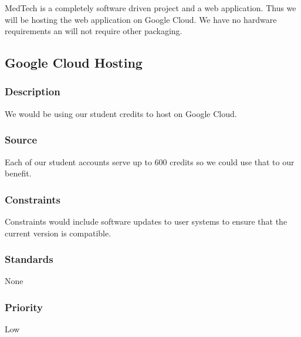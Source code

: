 MedTech is a completely software driven project and a web application. Thus we will be hosting the web application on Google Cloud. We have no hardware requirements an will not require other packaging. 

\subsection{Google Cloud Hosting}
\subsubsection{Description}
We would be using our student credits to host on Google Cloud. 
\subsubsection{Source}
Each of our student accounts serve up to 600 credits so we could use that to our benefit.       
\subsubsection{Constraints}
Constraints would include software updates to user systems to ensure that the current version is compatible. 
\subsubsection{Standards}
None 
\subsubsection{Priority}
Low